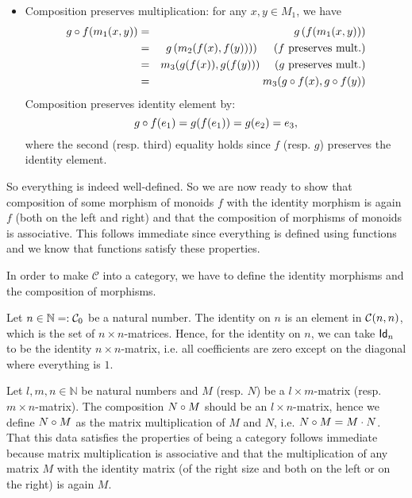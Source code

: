 \begin{solution}
\begin{itemize}
\begin{itemize}
\item Composition preserves multiplication: for any $x,y \in M_1$, we have
\begin{eqnarray*}
 \co{f}{g}(m_1(x,y)) &=& g\left(f(m_1(x,y))\right)\\ 
	&=& g\left(m_2(f(x),f(y)))\right) \quad \text{ ($f$ preserves mult.)} \\
	&=& m_3(g(f(x)),g(f(y))) \quad \text{ ($g$ preserves mult.)}\\
	&=& m_3(\co{f}{g}(x),\co{f}{g}(y))
\end{eqnarray*}
Composition preserves identity element by:
\[
\co{f}{g}(e_1) = g(f(e_1)) = g(e_2) = e_3,
\]
where the second (resp. third) equality holds since $f$ (resp. $g$) preserves the identity element.
\end{itemize}
\end{itemize}
So everything is indeed well-defined. So we are now ready to show that composition of some morphism of monoids $f$ with the identity morphism is again $f$ (both on the left and right) and that the composition of morphisms of monoids is associative. This follows immediate since everything is defined using functions and we know that functions satisfy these properties.
\end{solution}

\begin{solution}
  \label{sol:category_with_naturalnumbers_and_matrices}
  In order to make $\mathcal{C}$ into a category, we have to define the identity morphisms and the composition of morphisms.
  
  Let $n\in \mathbb{N} =: \Ob{\CC}$ be a natural number. The identity on $n$ is an element in $\CHom{\CC}{n}{n}$, which is the set of $n\times n$-matrices. Hence, for the identity on $n$, we can take $\Id[n]$ to be the identity $n\times n$-matrix, i.e. all coefficients are zero except on the diagonal where everything is $1$.
  
Let $l,m,n \in\mathbb{N}$ be natural numbers and $M$ (resp. $N$) be a $l\times m$-matrix (resp. $m\times n$-matrix). The composition $\co{M}{N}$ should be an $l\times n$-matrix, hence we define $\co{M}{N}$ as the matrix multiplication of $M$ and $N$, i.e. $\co{M}{N} = M\cdot N$.\\
That this data satisfies the properties of being a category follows immediate because matrix multiplication is associative and that the multiplication of any matrix $M$ with the identity matrix (of the right size and both on the left or on the right) is again $M$.
\end{solution}

